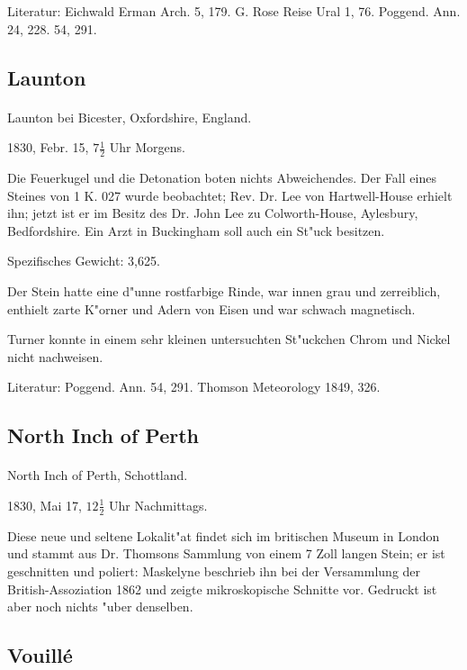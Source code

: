 \documentclass[a4paper, 11pt, oneside]{article}
\begin{document}
\footnotesize
Literatur: Eichwald Erman Arch. 5, 179. G. Rose Reise Ural 1, 76. Poggend. Ann. 24, 228. 54, 291.

\subsection{Launton}
\normalsize
\paragraph{}
Launton bei Bicester, Oxfordshire, England.

1830, Febr. 15, $7\frac{1}{2}$ Uhr Morgens.

Die Feuerkugel und die Detonation boten nichts Abweichendes. Der Fall eines Steines von 1 K. 027 wurde beobachtet; Rev. Dr. Lee von Hartwell-House erhielt ihn; jetzt ist er im Besitz des Dr. John Lee zu Colworth-House, Aylesbury, Bedfordshire. Ein Arzt in Buckingham soll auch ein St"uck besitzen.

Spezifisches Gewicht: 3,625.

Der Stein hatte eine d"unne rostfarbige Rinde, war innen grau und zerreiblich, enthielt zarte K"orner und Adern von Eisen und war schwach magnetisch.

Turner konnte in einem sehr kleinen untersuchten St"uckchen Chrom und Nickel nicht nachweisen.

\footnotesize
Literatur: Poggend. Ann. 54, 291. Thomson Meteorology 1849, 326.

\subsection{North Inch of Perth}
\normalsize
\paragraph{}
North Inch of Perth, Schottland.

1830, Mai 17, $12\frac{1}{2}$ Uhr Nachmittags.

Diese neue und seltene Lokalit"at findet sich im britischen Museum in London und stammt aus Dr. Thomsons Sammlung von einem 7 Zoll langen Stein; er ist geschnitten und poliert: Maskelyne beschrieb ihn bei der Versammlung der British-Assoziation 1862 und zeigte mikroskopische Schnitte vor. Gedruckt ist aber noch nichts "uber denselben.

\subsection{Vouillé}
\normalsize
\end{document}
